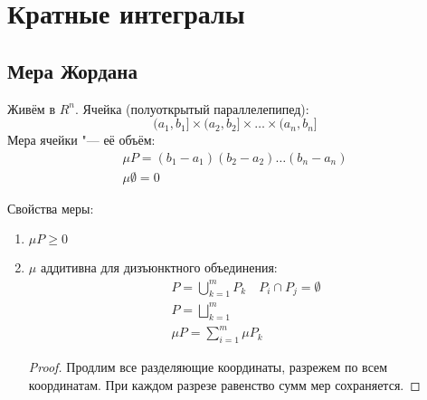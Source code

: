 \chapter{Кратные интегралы}

\section{Мера Жордана}

\begin{Def}
	Живём в $R^n$. Ячейка (полуоткрытый параллелепипед):
	\[ (a_1, b_1] \times (a_2, b_2] \times \dots \times (a_n, b_n] \]
	Мера ячейки "--- её объём:
	\begin{gather*}
		\mu P = (b_1 - a_1) (b_2 - a_2) \dots (b_n - a_n) \\
		\mu \emptyset = 0
	\end{gather*}
\end{Def}
Свойства меры:
\begin{enumerate}
\item
	$\mu P \ge 0$

\item
	$\mu$ аддитивна для дизъюнктного объединения:
	\begin{gather*}
		P = \bigcup_{k=1}^m P_k \quad P_i \cap P_j = \emptyset \\
		P = \bigsqcup_{k=1}^m \\
		\mu P = \sum_{i=1}^m \mu P_k
	\end{gather*}
	\begin{proof}
		Продлим все разделяющие координаты, разрежем по всем координатам. При каждом разрезе равенство сумм мер сохраняется.
	\end{proof}
\end{enumerate}

